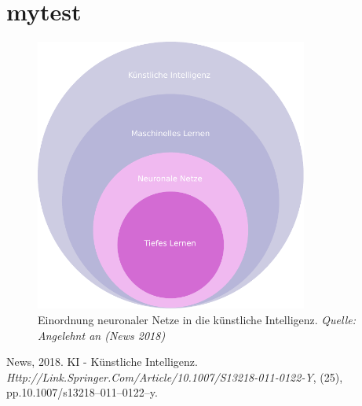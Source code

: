 \hypertarget{mytest}{%
\section{mytest}\label{mytest}}

\begin{figure}
\centering
\includegraphics[width=0.8\textwidth,height=\textheight]{source/figures/ki_ml_dl.pdf}
\caption{Einordnung neuronaler Netze in die künstliche Intelligenz.
\emph{Quelle: Angelehnt an (News 2018)} \label{ki_ml_dl}}
\end{figure}

\hypertarget{refs}{}
\leavevmode\hypertarget{ref-News2018}{}%
News, 2018. KI - Künstliche Intelligenz.
\emph{Http://Link.Springer.Com/Article/10.1007/S13218-011-0122-Y}, (25),
pp.10.1007/s13218--011--0122--y.
